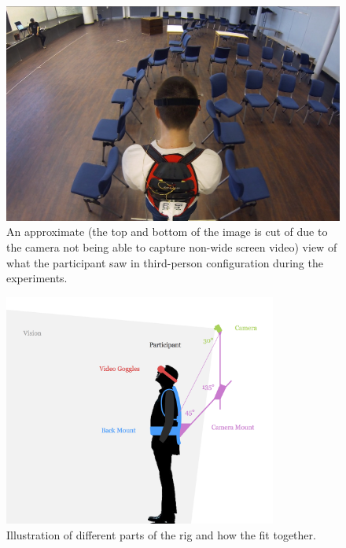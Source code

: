 \documentclass[runningheads,a4paper,oribibl]{llncs}
\begin{document}
\begin{figure}
   \centering
   \includegraphics[width=\textwidth]{ExternalMaterial/3Pview}

   \caption{An approximate (the top and bottom of the image is cut of due to the camera not being able to capture non-wide screen video) view of what the participant saw in third-person configuration during the experiments. \label{fig:3Pview}}
\end{figure}



\begin{figure}
   \centering
   \includegraphics[width=0.8\textwidth]{ExternalMaterial/Rig}
   \caption{Illustration of different parts of the rig and how the fit together. \label{fig:RigDesign}}
\end{figure}
\end{document}
